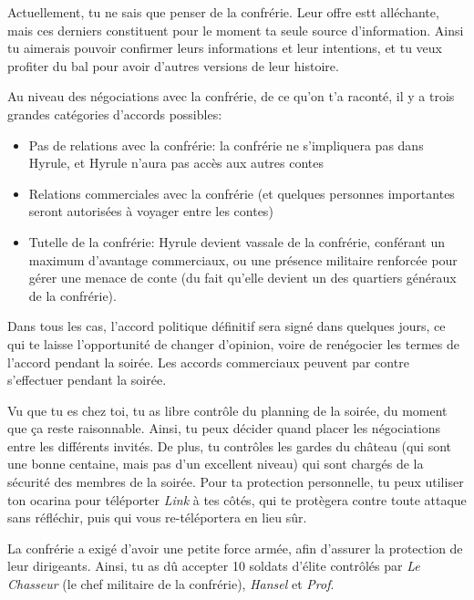 {	\par Actuellement, tu ne sais que penser de la confrérie. Leur offre estt alléchante, mais ces derniers constituent pour le moment ta seule source d'information. Ainsi tu aimerais pouvoir confirmer leurs informations et leur intentions, et tu veux profiter du bal pour avoir d'autres versions de leur histoire.
	
	\par Au niveau des négociations avec la confrérie, de ce qu'on t'a raconté, il y a trois grandes catégories d'accords possibles:
	\begin{itemize}
		\item Pas de relations avec la confrérie: la confrérie ne s'impliquera pas dans Hyrule, et Hyrule n'aura pas accès aux autres contes
		\item Relations commerciales avec la confrérie (et quelques personnes importantes seront autorisées à voyager entre les contes)
		\item Tutelle de la confrérie: Hyrule devient vassale de la confrérie, conférant un maximum d'avantage commerciaux, ou une présence militaire renforcée pour gérer une menace de conte (du fait qu'elle devient un des quartiers généraux de la confrérie).
	\end{itemize}
	Dans tous les cas, l'accord politique définitif sera signé dans quelques jours, ce qui te laisse l'opportunité de changer d'opinion, voire de renégocier les termes de l'accord pendant la soirée. Les accords commerciaux peuvent par contre s'effectuer pendant la soirée.
	
	\par Vu que tu es chez toi, tu as libre contrôle du planning de la soirée, du moment que ça reste raisonnable. Ainsi, tu peux décider quand placer les négociations entre les différents invités. De plus, tu contrôles les gardes du château (qui sont une bonne centaine, mais pas d'un excellent niveau) qui sont chargés de la sécurité des membres de la soirée. Pour ta protection personnelle, tu peux utiliser ton ocarina pour téléporter \emph{Link} à tes côtés, qui te protègera contre toute attaque sans réfléchir, puis qui vous re-téléportera en lieu sûr.
	
	\par La confrérie a exigé d'avoir une petite force armée, afin d'assurer la protection de leur dirigeants. Ainsi, tu as dû accepter 10 soldats d'élite contrôlés par \emph{Le Chasseur} (le chef militaire de la confrérie), \emph{Hansel} et \emph{Prof}.
	
}
